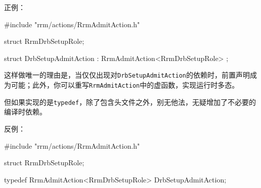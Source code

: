 \begin{content}
正例：
\begin{leftbar}
\begin{c++}
#include "rrm/actions/RrmAdmitAction.h"

struct RrmDrbSetupRole;

struct DrbSetupAdmitAction : RrmAdmitAction<RrmDrbSetupRole> {};
\end{c++}
\end{leftbar}

这样做唯一的理由是，当仅仅出现对\texttt{DrbSetupAdmitAction}的依赖时，前置声明成为可能；此外，你可以重写\texttt{RrmAdmitAction}中的虚函数，实现运行时多态。

但如果实现的是\texttt{typedef}，除了包含头文件之外，别无他法，无疑增加了不必要的编译时依赖。

反例：
\begin{leftbar}
\begin{c++}
#include "rrm/actions/RrmAdmitAction.h"

struct RrmDrbSetupRole;

typedef RrmAdmitAction<RrmDrbSetupRole> DrbSetupAdmitAction;
\end{c++}
\end{leftbar}

\end{content}
